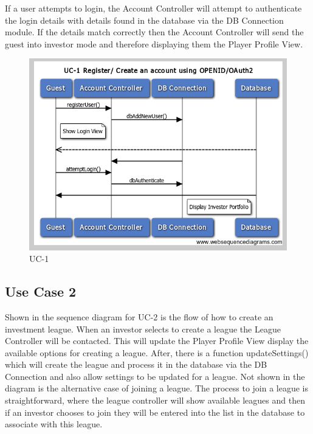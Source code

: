 If a user attempts to login, the Account Controller will attempt to authenticate
the login details with details found in the database via the DB Connection
module. If the details match correctly then the Account Controller will send the
guest into investor mode and therefore displaying them the Player Profile View.

\begin{figure}[H]
\centering
\includegraphics[width=5.5in]{./img/inter/UC1.png}
\caption{UC-1}
\end{figure}

\subsection{Use Case 2}
Shown in the sequence diagram for UC-2 is the flow of how to create an
investment league. When an investor selects to create a league the League
Controller will be contacted. This will update the Player Profile View display
the available options for creating a league. After, there is a function
updateSettings() which will create the league and process it in the database
via the DB Connection and also allow settings to be updated for a league. Not
shown in the diagram is the alternative case of joining a league. The process
to join a league is straightforward, where the league controller will show
available leagues and then if an investor chooses to join they will be entered
into the list in the database to associate with this league.

